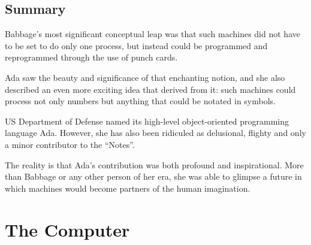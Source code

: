 \subsection{Summary}

Babbage's most significant conceptual leap was that such machines did not have
to be set to do only one process, but instead could be programmed and
reprogrammed through the use of punch cards.

Ada saw the beauty and significance of that enchanting notion, and she also
described an even more exciting idea that derived from it: such machines
could process not only numbers but anything that could be notated in symbols.

US Department of Defense named its high-level object-oriented programming
language Ada. However, she has also been ridiculed as delusional, flighty and
only a minor contributor to the ``Notes''.

The reality is that Ada's contribution was both profound and inspirational. More
than Babbage or any other person of her era, she was able to glimpse a future in
which machines would become partners of the human imagination.

\section{The Computer}


